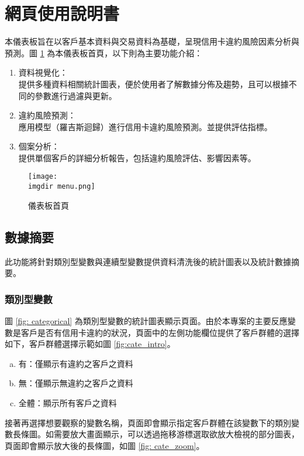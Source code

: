 \documentclass[12pt, a4paper]{article}
\begin{document}
\begin{itemize}
\begin{enumerate}
\end{enumerate}
\end{itemize}

\section{網頁使用說明書}

本儀表板旨在以客戶基本資料與交易資料為基礎，呈現信用卡違約風險因素分析與預測。圖 \ref{fig: menu} 為本儀表板首頁，以下則為主要功能介紹：

\begin{enumerate}
	\item 資料視覺化：\\提供多種資料相關統計圖表，便於使用者了解數據分佈及趨勢，且可以根據不同的參數進行過濾與更新。

	\item 違約風險預測：\\應用模型（羅吉斯迴歸）進行信用卡違約風險預測。並提供評估指標。

	\item 個案分析：\\提供單個客戶的詳細分析報告，包括違約風險評估、影響因素等。

\end{enumerate}

\begin{figure}[H]
    \centering
        \texttt{[image: 
        \\imgdir menu.png]}
     \caption{儀表板首頁}
    \label{fig: menu}
\end{figure}

\subsection{數據摘要}
此功能將針對類別型變數與連續型變數提供資料清洗後的統計圖表以及統計數據摘要。
\subsubsection{類別型變數}

圖 \ref{fig: categorical} 為類別型變數的統計圖表顯示頁面。由於本專案的主要反應變數是客戶是否有信用卡違約的狀況，頁面中的左側功能欄位提供了客戶群體的選擇如下，客戶群體選擇示範如圖 \ref{fig:cate_intro}。
\begin{enumerate}[(a)]
\item 有：僅顯示有違約之客戶之資料 
\item 無：僅顯示無違約之客戶之資料
\item 全體：顯示所有客戶之資料
\end{enumerate}
接著再選擇想要觀察的變數名稱，頁面即會顯示指定客戶群體在該變數下的類別變數長條圖。如需要放大畫面顯示，可以透過拖移游標選取欲放大檢視的部分圖表，頁面即會顯示放大後的長條圖，如圖 \ref{fig: cate_zoom}。
\end{document}
